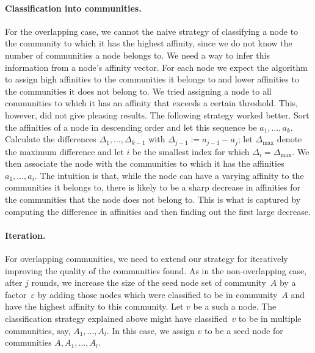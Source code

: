 \paragraph{Classification into communities.} For the overlapping case, we cannot
the naive strategy of classifying a node to the community to which it has 
the highest affinity, since we do not know the number of communities a node belongs to. 
We need a way to infer this information from a node's affinity vector.
For each node we expect the algorithm to assign high affinities 
to the communities it belongs to and lower affinities to the communities it does not belong to. 
We tried assigning a node to all communities to which it has an affinity that exceeds a certain threshold.
This, however, did not give pleasing results.
The following strategy worked better.
Sort the affinities of a node in descending order and let this 
sequence be $a_1, \ldots, a_k$. Calculate the differences 
$\Delta_{1}, \ldots, \Delta_{k-1}$ with $\Delta_{j-1} := a_{j - 1} - a_j$;
let $\Delta_{\mathrm{max}}$ denote the maximum difference 
and let $i$ be the smallest index for which $\Delta_i = \Delta_{\mathrm{max}}$. We then associate 
the node with the communities to which it has the affinities $a_1, \ldots, a_i$. 
The intuition is that, while the node can have a varying affinity to the communities it belongs to, 
there is likely to be a sharp decrease in affinities for the communities that the node does 
not belong to. This is what is captured by computing the difference in affinities and then finding 
out the first large decrease.

\paragraph{Iteration.}
For overlapping communities, we need to extend our strategy for iteratively improving the quality 
of the communities found. As in the non-overlapping case, after $j$ rounds, we increase the 
size of the seed node set of community~$A$ by a factor~$\varepsilon$ by adding those nodes 
which were classified to be in community~$A$ and have the highest affinity to this community. 
Let $v$ be a such a node. The classification strategy explained above might have classified~$v$ 
to be in multiple communities, say, $A_1, \dots, A_l$. In this case, we assign $v$ 
to be a seed node for communities $A, A_1, \ldots, A_l$. 

